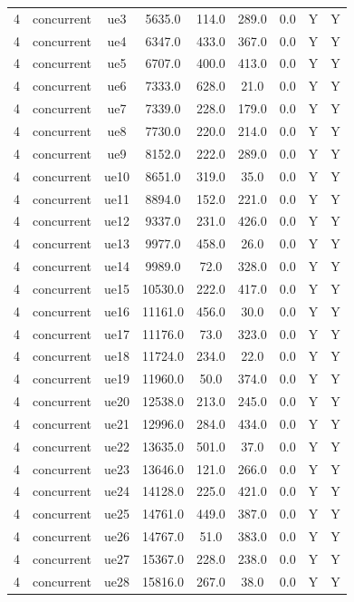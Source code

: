 \begin{table}[ht]
\begin{tabular}{|c|c|c|c|c|c|c|c|c|}
4 & concurrent & ue3 & 5635.0 & 114.0 & 289.0 & 0.0 & Y & Y \\
4 & concurrent & ue4 & 6347.0 & 433.0 & 367.0 & 0.0 & Y & Y \\
4 & concurrent & ue5 & 6707.0 & 400.0 & 413.0 & 0.0 & Y & Y \\
4 & concurrent & ue6 & 7333.0 & 628.0 & 21.0 & 0.0 & Y & Y \\
4 & concurrent & ue7 & 7339.0 & 228.0 & 179.0 & 0.0 & Y & Y \\
4 & concurrent & ue8 & 7730.0 & 220.0 & 214.0 & 0.0 & Y & Y \\
4 & concurrent & ue9 & 8152.0 & 222.0 & 289.0 & 0.0 & Y & Y \\
4 & concurrent & ue10 & 8651.0 & 319.0 & 35.0 & 0.0 & Y & Y \\
4 & concurrent & ue11 & 8894.0 & 152.0 & 221.0 & 0.0 & Y & Y \\
4 & concurrent & ue12 & 9337.0 & 231.0 & 426.0 & 0.0 & Y & Y \\
4 & concurrent & ue13 & 9977.0 & 458.0 & 26.0 & 0.0 & Y & Y \\
4 & concurrent & ue14 & 9989.0 & 72.0 & 328.0 & 0.0 & Y & Y \\
4 & concurrent & ue15 & 10530.0 & 222.0 & 417.0 & 0.0 & Y & Y \\
4 & concurrent & ue16 & 11161.0 & 456.0 & 30.0 & 0.0 & Y & Y \\
4 & concurrent & ue17 & 11176.0 & 73.0 & 323.0 & 0.0 & Y & Y \\
4 & concurrent & ue18 & 11724.0 & 234.0 & 22.0 & 0.0 & Y & Y \\
4 & concurrent & ue19 & 11960.0 & 50.0 & 374.0 & 0.0 & Y & Y \\
4 & concurrent & ue20 & 12538.0 & 213.0 & 245.0 & 0.0 & Y & Y \\
4 & concurrent & ue21 & 12996.0 & 284.0 & 434.0 & 0.0 & Y & Y \\
4 & concurrent & ue22 & 13635.0 & 501.0 & 37.0 & 0.0 & Y & Y \\
4 & concurrent & ue23 & 13646.0 & 121.0 & 266.0 & 0.0 & Y & Y \\
4 & concurrent & ue24 & 14128.0 & 225.0 & 421.0 & 0.0 & Y & Y \\
4 & concurrent & ue25 & 14761.0 & 449.0 & 387.0 & 0.0 & Y & Y \\
4 & concurrent & ue26 & 14767.0 & 51.0 & 383.0 & 0.0 & Y & Y \\
4 & concurrent & ue27 & 15367.0 & 228.0 & 238.0 & 0.0 & Y & Y \\
4 & concurrent & ue28 & 15816.0 & 267.0 & 38.0 & 0.0 & Y & Y \\

\end{tabular}
\end{table}
